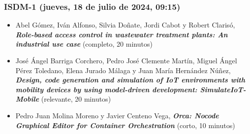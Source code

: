 \begin{frame}
  \frametitle{ISDM-1 (jueves, 18 de julio de 2024, 09:15)}
\begin{itemize}

\item \small{Abel Gómez, Iván Alfonso, Silvia Doñate, Jordi Cabot y Robert Clarisó}, %
      {\bfseries\itshape Role-based access control in wastewater treatment plants: An industrial use case} %
      \small{(completo, 20 minutos)}

\item \small{José Ángel Barriga Corchero, Pedro José Clemente Martín, Miguel Ángel Pérez Toledano, Elena Jurado Málaga y Juan María Hernández Núñez}, %
      {\bfseries\itshape Design, code generation and simulation of IoT environments with mobility devices by using model-driven development: SimulateIoT-Mobile} %
      \small{(relevante, 20 minutos)}

\item \small{Pedro Juan Molina Moreno y Javier Centeno Vega}, %
      {\bfseries\itshape Orca: Nocode Graphical Editor for Container Orchestration} %
      \small{(corto, 10 minutos)}

\end{itemize}
\end{frame}
